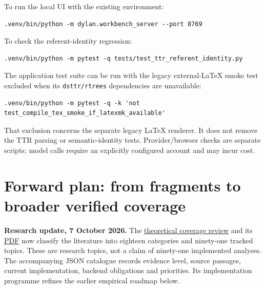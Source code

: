 \documentclass[11pt,a4paper]{article}
\begin{document}
To run the local UI with the existing environment:

\begin{Verbatim}[fontsize=\small,breaklines=true,breakanywhere=true,commandchars=\\\{\},frame=single,rulecolor=\color{DSmuted},framesep=5pt]
.venv/bin/python -m dylan.workbench_server --port 8769
\end{Verbatim}

To check the referent-identity regression:

\begin{Verbatim}[fontsize=\small,breaklines=true,breakanywhere=true,commandchars=\\\{\},frame=single,rulecolor=\color{DSmuted},framesep=5pt]
.venv/bin/python -m pytest -q tests/test_ttr_referent_identity.py
\end{Verbatim}

The application test suite can be run with the legacy external-LaTeX
smoke test excluded when its \nolinkurl{dsttr/rtrees} dependencies are
unavailable:

\begin{Verbatim}[fontsize=\small,breaklines=true,breakanywhere=true,commandchars=\\\{\},frame=single,rulecolor=\color{DSmuted},framesep=5pt]
.venv/bin/python -m pytest -q -k 'not test_compile_tex_smoke_if_latexmk_available'
\end{Verbatim}

That exclusion concerns the separate legacy LaTeX renderer. It does not
remove the TTR parsing or semantic-identity tests. Provider/browser
checks are separate scripts; model calls require an explicitly
configured account and may incur cost.

\section{Forward plan: from fragments to broader verified
coverage}\label{forward-plan-from-fragments-to-broader-verified-coverage}

\textbf{Research update, 7 October 2026.} The
\href{research/ds-theoretical-coverage.md}{theoretical coverage review}
and its \href{research/ds-theoretical-coverage.pdf}{PDF} now classify
the literature into eighteen categories and ninety-one tracked topics.
These are research topics, not a claim of ninety-one implemented
analyses. The accompanying JSON catalogue records evidence level, source
passages, current implementation, backend obligations and priorities.
Its implementation programme refines the earlier empirical roadmap
below.
\end{document}
